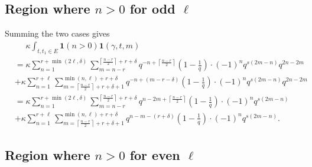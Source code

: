 \subsection{Region where $n > 0$ for odd $\ell$}
Summing the two cases gives
\begin{align*}
  &\phantom=
    \kappa \int_{t, t_1 \in E} \mathbf{1}(n > 0) \mathbf{1}(\gamma,t,m) \\
  &= \kappa \sum_{n=1}^{r+\min(2\ell,\delta)}
    \sum_{m=n-r}^{\left\lceil \frac{n-r}{2} \right\rceil+r+\delta}
    q^{-n + \left\lceil \frac{n-r}{2} \right\rceil} \left( 1 - \frac 1q \right)
    \cdot (-1)^n q^{s(2m-n)} q^{2n-2m} \\
  &+ \kappa \sum_{n=1}^{r+\ell}
    \sum_{m=\left\lceil \frac{n-r}{2} \right\rceil+r+\delta+1}^{\min(n,\ell)+r+\delta}
    q^{-n + (m-r-\delta)} \left( 1 - \frac 1q \right)
    \cdot (-1)^n q^{s(2m-n)} q^{2n-2m} \\
  &= \kappa \sum_{n=1}^{r+\min(2\ell,\delta)}
    \sum_{m=n-r}^{\left\lceil \frac{n-r}{2} \right\rceil+r+\delta}
    q^{n-2m + \left\lceil \frac{n-r}{2} \right\rceil} \left( 1 - \frac 1q \right)
    \cdot (-1)^n q^{s(2m-n)} \\
  &+ \kappa \sum_{n=1}^{r+\ell}
    \sum_{m=\left\lceil \frac{n-r}{2} \right\rceil+r+\delta+1}^{\min(n,\ell)+r+\delta}
    q^{n-m-(r+\delta)} \left( 1 - \frac 1q \right)
    \cdot (-1)^n q^{s(2m-n)}.
\end{align*}

\subsection{Region where $n > 0$ for even $\ell$}
